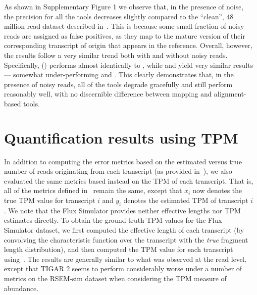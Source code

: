 As shown in Supplementary Figure 1 we observe that, in the presence of noise, the precision for all the tools decreases slightly compared to the ``clean'', 48 million read dataset described in~. This is because some small fraction of noisy reads are assigned as false positives, as they map to the mature version of their corresponding transcript of origin that appears in the reference. Overall, however, the results follow a very similar trend both with and without noisy reads.  Specifically, \rapmap (\qm) performs almost identically to \bt, while \kallisto and \STAR yield very similar results --- somewhat under-performing \rapmap and \bt.  This clearly demonstrates that, in the presence of noisy reads, all of the tools degrade gracefully and still perform reasonably well, with no discernible difference between mapping and alignment-based tools.

\section{Quantification results using TPM}
\label{subsec:tpm_quant}

In addition to computing the error metrics based on the estimated versus true number of reads originating from each transcript (as provided in~), we also evaluated the same metrics based instead on the TPM of each transcript.  That is, all of the metrics defined in~ remain the same, except that $x_i$ now denotes the true TPM value for transcript $i$ and $y_i$ denotes the estimated TPM of transcript $i$.  We note that the Flux Simulator provides neither effective lengths nor TPM estimates directly.  To obtain the ground truth TPM values for the Flux Simulator dataset, we first computed the effective length of each transcript (by convolving the characteristic function over the transcript with the \textit{true} fragment length distribution), and then computed the TPM value for each transcript using~.  The results are generally similar to what was observed at the read level, except that TIGAR 2 seems to perform considerably worse under a number of metrics on the RSEM-sim dataset when considering the TPM measure of abundance. 

